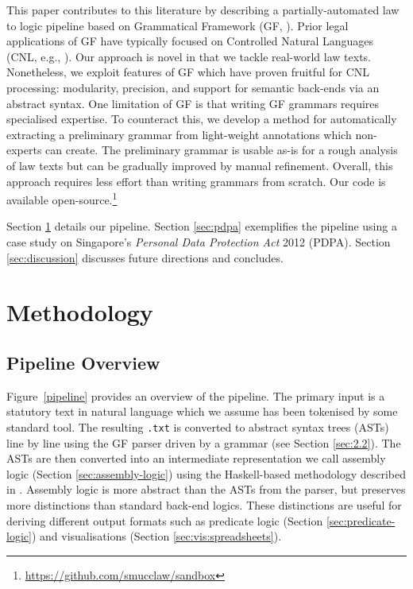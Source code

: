 \documentclass{IOS-Book-Article}
\begin{document}
This paper contributes to this literature by describing a partially-automated law to logic pipeline based on Grammatical Framework (GF, \cite{ranta-2011}). Prior legal applications of GF \cite{angelov-al-2013, gdpr-2018} have typically focused on Controlled Natural Languages (CNL, e.g., \cite{fuchs-al-2008, angelov-ranta-2009}).
Our approach is novel in that we tackle real-world law texts. Nonetheless, we exploit features of GF which have proven fruitful for CNL processing: modularity, precision, and support for semantic back-ends via an abstract syntax. One limitation of GF is that writing GF grammars requires specialised expertise. To counteract this, we develop a method for automatically extracting a preliminary grammar from light-weight annotations which non-experts can create. The preliminary grammar is usable as-is for a rough analysis of law texts but can be gradually improved by manual refinement. Overall, this approach requires less effort than writing grammars from scratch. Our code is available open-source.\footnote{\url{https://github.com/smucclaw/sandbox}}

Section \ref{sec:methods} details our pipeline. Section \ref{sec:pdpa} exemplifies the pipeline using a case study on Singapore's \textit{Personal Data Protection Act} 2012 (PDPA). Section \ref{sec:discussion} discusses future directions and concludes.

\section{Methodology}
\label{sec:methods}

\subsection{Pipeline Overview}

Figure~\ref{pipeline} provides an overview of the pipeline. The primary input is a statutory text in natural language which we assume has been tokenised by some standard tool.
The resulting \texttt{.txt} is converted to abstract syntax trees (ASTs) line by line using the GF parser driven by a grammar (see Section \ref{sec:2.2}). 
The ASTs are then converted into an intermediate representation we call assembly logic (Section \ref{sec:assembly-logic}) using the Haskell-based methodology described in \cite{ranta-2011c}. Assembly logic is more abstract than the ASTs from the parser, but preserves more distinctions than standard back-end logics.
These distinctions are useful for deriving different output formats such as predicate logic (Section \ref{sec:predicate-logic}) and visualisations (Section \ref{sec:vis:spreadsheets}).
\end{document}
